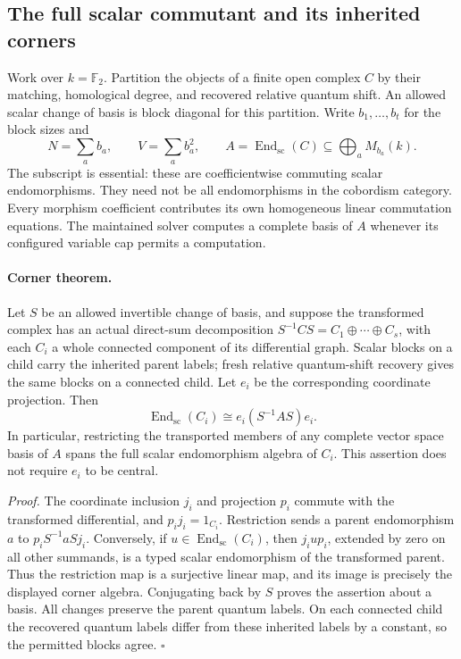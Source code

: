 \subsection{The full scalar commutant and its inherited corners}

Work over $k=\mathbb F_2$. Partition the objects of a finite open complex $C$
by their matching, homological degree, and recovered relative quantum shift.
An allowed scalar change of basis is block diagonal for this partition.
Write $b_1,\ldots,b_t$ for the block sizes and
\[
 N=\sum_a b_a,\qquad V=\sum_a b_a^2,\qquad
 A=\operatorname{End}_{\mathrm{sc}}(C)
   \subseteq\bigoplus_a M_{b_a}(k).
\]
The subscript is essential: these are coefficientwise commuting scalar
endomorphisms. They need not be all endomorphisms in the cobordism category.
Every morphism coefficient contributes its own homogeneous linear
commutation equations. The maintained solver computes a complete basis of
$A$ whenever its configured variable cap permits a computation.

\paragraph{Corner theorem.}
Let $S$ be an allowed invertible change of basis, and suppose the transformed
complex has an actual direct-sum decomposition
$S^{-1}CS=C_1\oplus\cdots\oplus C_s$, with each $C_i$ a whole connected
component of its differential graph. Scalar blocks on a child carry the
inherited parent labels; fresh relative quantum-shift recovery gives the
same blocks on a connected child. Let $e_i$ be the corresponding
coordinate projection. Then
\[
 \operatorname{End}_{\mathrm{sc}}(C_i)
    \cong e_i(S^{-1}AS)e_i.
\]
In particular, restricting the transported members of any complete vector
space basis of $A$ spans the full scalar endomorphism algebra of $C_i$.
This assertion does not require $e_i$ to be central.

\emph{Proof.}
The coordinate inclusion $j_i$ and projection $p_i$ commute with the
transformed differential, and $p_i j_i=1_{C_i}$. Restriction sends a
parent endomorphism $a$ to $p_iS^{-1}aSj_i$. Conversely, if
$u\in\operatorname{End}_{\mathrm{sc}}(C_i)$, then $j_iup_i$, extended by
zero on all other summands, is a typed scalar endomorphism of the transformed
parent. Thus the restriction map is a surjective linear map, and its image
is precisely the displayed corner algebra. Conjugating back by $S$ proves
the assertion about a basis. All changes preserve the parent quantum
labels. On each connected child the recovered quantum labels differ from
these inherited labels by a constant, so the permitted blocks agree.
\hfill$\square$

